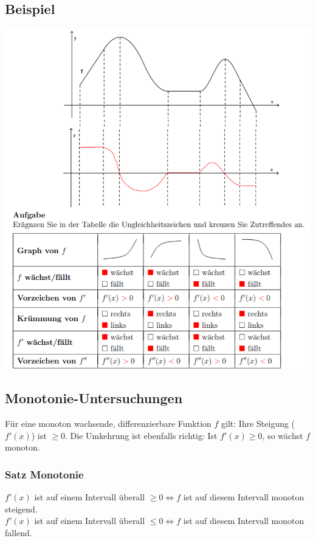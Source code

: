 \subsection{Beispiel}
\begin{center}
    \includegraphics[width=1\linewidth]{images/ablbsp.png}
\end{center}

\subsection{Monotonie-Untersuchungen}
Für eine monoton wachsende, differenzierbare Funktion $f$ gilt: Ihre Steigung ($f'(x)$) ist $\geq 0$. Die Umkehrung ist ebenfalls richtig: Ist $f'(x) \geq 0$, so wächst $f$ monoton.

\subsubsection{Satz Monotonie}
$f'(x)$ ist auf einem Intervall überall $\geq 0 \Leftrightarrow f$ ist auf diesem Intervall monoton steigend. \\
$f'(x)$ ist auf einem Intervall überall $\leq 0 \Leftrightarrow f$ ist auf diesem Intervall monoton fallend.

